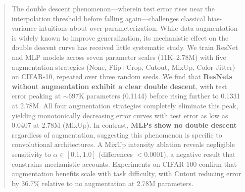 \begin{abstract}
The double descent phenomenon---wherein test error rises near the interpolation threshold before falling again---challenges classical bias-variance intuitions about over-parameterization. While data augmentation is widely known to improve generalization, its mechanistic effect on the double descent curve has received little systematic study. We train ResNet and MLP models across seven parameter scales (11K--2.78M) with five augmentation strategies (None, Flip+Crop, Cutout, MixUp, Color Jitter) on CIFAR-10, repeated over three random seeds. We find that \textbf{ResNets without augmentation exhibit a clear double descent}, with test error peaking at $\sim$697K parameters (0.1144) before rising further to 0.1331 at 2.78M. All four augmentation strategies completely eliminate this peak, yielding monotonically decreasing error curves with test error as low as 0.0407 at 2.78M (MixUp). In contrast, \textbf{MLPs show no double descent} regardless of augmentation, suggesting this phenomenon is specific to convolutional architectures. A MixUp intensity ablation reveals negligible sensitivity to $\alpha \in [0.1, 1.0]$ (differences $<$0.0001), a negative result that constrains mechanistic accounts. Experiments on CIFAR-100 confirm that augmentation benefits scale with task difficulty, with Cutout reducing error by 36.7\% relative to no augmentation at 2.78M parameters.
\end{abstract}
